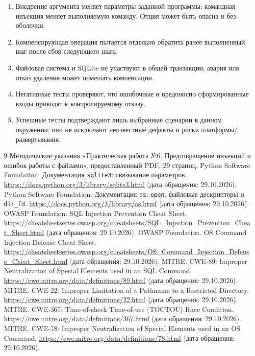 \documentclass[12pt,a4paper]{article}
\begin{document}
\begin{enumerate}
\item Внедрение аргумента меняет параметры заданной программы; командная инъекция меняет выполняемую команду. Опция может быть опасна и без оболочки.
\item Компенсирующая операция пытается отдельно обратить ранее выполненный шаг после сбоя следующего шага.
\item Файловая система и SQLite не участвуют в общей транзакции; авария или отказ удаления может помешать компенсации.
\item Негативные тесты проверяют, что ошибочные и вредоносно сформированные входы приводят к контролируемому отказу.
\item Успешные тесты подтверждают лишь выбранные сценарии в данном окружении; они не исключают неизвестные дефекты и риски платформы/развертывания.
\end{enumerate}

\begin{thebibliography}{9}
 Методические указания «Практическая работа №6. Предотвращение инъекций и ошибок работы с файлами», предоставленный PDF, 29 страниц.
 Python Software Foundation. Документация \texttt{sqlite3}: связывание параметров. \url{https://docs.python.org/3/library/sqlite3.html} (дата обращения: 29.10.2026).
 Python Software Foundation. Документация \texttt{os}: \texttt{open}, файловые дескрипторы и \texttt{dir\_fd}. \url{https://docs.python.org/3/library/os.html} (дата обращения: 29.10.2026).
 OWASP Foundation. SQL Injection Prevention Cheat Sheet. \url{https://cheatsheetseries.owasp.org/cheatsheets/SQL_Injection_Prevention_Cheat_Sheet.html} (дата обращения: 29.10.2026).
 OWASP Foundation. OS Command Injection Defense Cheat Sheet. \url{https://cheatsheetseries.owasp.org/cheatsheets/OS_Command_Injection_Defense_Cheat_Sheet.html} (дата обращения: 29.10.2026).
 MITRE. CWE-89: Improper Neutralization of Special Elements used in an SQL Command. \url{https://cwe.mitre.org/data/definitions/89.html} (дата обращения: 29.10.2026).
 MITRE. CWE-22: Improper Limitation of a Pathname to a Restricted Directory. \url{https://cwe.mitre.org/data/definitions/22.html} (дата обращения: 29.10.2026).
 MITRE. CWE-367: Time-of-check Time-of-use (TOCTOU) Race Condition. \url{https://cwe.mitre.org/data/definitions/367.html} (дата обращения: 29.10.2026).
 MITRE. CWE-78: Improper Neutralization of Special Elements used in an OS Command. \url{https://cwe.mitre.org/data/definitions/78.html} (дата обращения: 29.10.2026).
\end{thebibliography}
\end{document}
